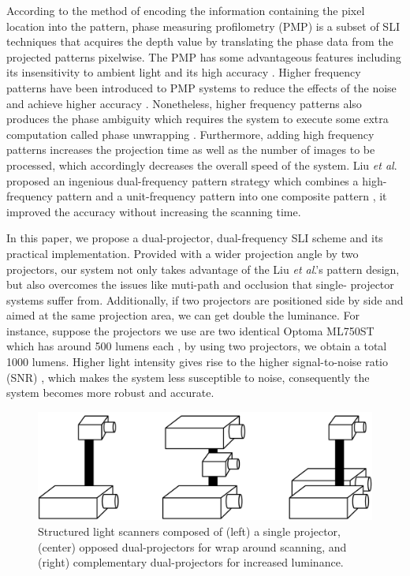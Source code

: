 \documentclass[]{spie}  %
\begin{document}
According to the method of encoding the information containing the pixel location into the pattern, phase measuring profilometry (PMP) \cite{srin85} is a subset of SLI techniques that acquires the depth value by translating the phase data from the projected patterns pixelwise. The PMP has some advantageous features including its insensitivity to ambient light and its high accuracy \cite{guan03, hali89}. Higher frequency patterns have been introduced to PMP systems to reduce the effects of the noise and achieve higher accuracy \cite{lijl03}. Nonetheless, higher frequency patterns also produces the phase ambiguity which requires the system to execute some extra computation called phase unwrapping \cite{song18}. Furthermore, adding high frequency patterns increases the projection time as well as the number of images to be processed, which accordingly decreases the overall speed of the system. Liu \textit{et al}. proposed an ingenious dual-frequency pattern strategy which combines a high-frequency pattern and a unit-frequency pattern into one composite pattern \cite{liuk10}, it improved the accuracy without increasing the scanning time.

In this paper, we propose a dual-projector, dual-frequency SLI scheme and its practical implementation. Provided with a wider projection angle by two projectors, our system not only takes advantage of the Liu \textit{et al}.'s pattern design, but also overcomes the issues like muti-path \cite{otoo16} and occlusion \cite{linj13} that single- projector systems suffer from. Additionally, if two projectors are positioned side by side and aimed at the same projection area, we can get double the luminance. For instance, suppose the projectors we use are two identical Optoma ML750ST which has around 500 lumens each \cite{lume70}, by using two projectors, we obtain a total 1000 lumens. Higher light intensity gives rise to the higher signal-to-noise ratio (SNR) \cite{wangy10}, which makes the system less susceptible to noise, consequently the system becomes more robust and accurate.

\begin{figure}
\centerline{\includegraphics[width=5.0in]{Figures/Layouts}}
\vspace{0.1in}
\caption{Structured light scanners composed of (left) a single projector, (center) opposed dual-projectors for wrap around scanning, and (right) complementary dual-projectors for increased luminance.}
\label{Fig:10}
\end{figure} 
\end{document}
